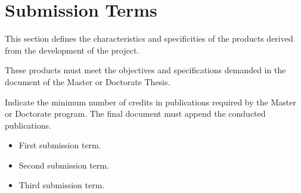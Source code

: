 \section{Submission Terms}
\label{sec:submission_terms}

This section defines the characteristics and specificities of the products derived from the development of the project.

These products must meet the objectives and specifications demanded in the document of the Master or Doctorate Thesis.

Indicate the minimum number of credits in publications required by the Master or Doctorate program. The final document must append the conducted publications.

\begin{itemize}
    \item First submission term.
    
    \item Second submission term.
    
    \item Third submission term.
\end{itemize}